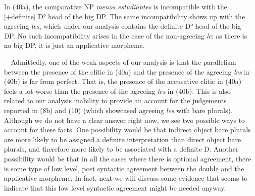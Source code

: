 \documentclass[output=paper,colorlinks,citecolor=brown,
]{langscibook}
\begin{document}
In (40a), the comparative NP \textit{menos estudiantes} is incompatible with the [+definite] D° head of the big DP. The same incompatibility shows up with the agreeing \textit{les}, which under our analysis contains the definite D° head of the big DP. No such incompatibility arises in the case of the non-agreeing \textit{le}: as there is no big DP, it is just an applicative morpheme.

\ \ Admittedly, one of the weak aspects of our analysis is that the parallelism between the presence of the clitic in (40a) and the presence of the agreeing \textit{les} in (40b) is far from perfect. That is, the presence of the accusative clitic in (40a) feels a lot worse than the presence of the agreeing \textit{les} in (40b). This is also related to our analysis inability to provide an account for the judgements reported in (8b) and (10) (which showcased agreeing \textit{les }with bare plurals). Although we do not have a clear answer right now, we see two possible ways to account for these facts. One possibility would be that indirect object bare plurals are more likely to be assigned a definite interpretation than direct object bare plurals, and therefore more likely to be associated with a definite D. Another possibility would be that in all the cases where there is optional agreement, there is some type of low level, post syntactic agreement between the double and the applicative morpheme. In fact, next we will discuss some evidence that seems to indicate that this low level syntactic agreement might be needed anyway. 

\end{document}
